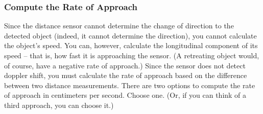 \subsubsection{Compute the Rate of Approach} \label{subsubsec:approachRate}

Since the distance sensor cannot determine the change of direction to the detected object (indeed, it cannot determine the direction), you cannot calculate the object's speed.
You can, however, calculate the longitudinal component of its speed -- that is, how fast it is approaching the sensor.
(A retreating object would, of course, have a negative rate of approach.)
Since the sensor does not detect doppler shift, you must calculate the rate of approach based on the difference between two distance measurements.
There are two options to compute the rate of approach in centimeters per second.
Choose one.
(Or, if you can think of a third approach, you can choose it.)

